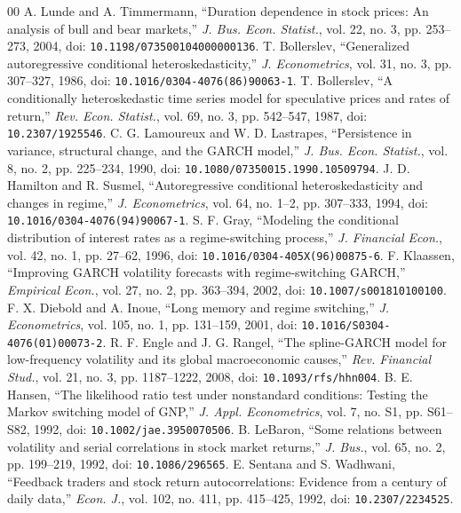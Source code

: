 \documentclass[conference]{IEEEtran}
\begin{document}
\begin{thebibliography}{00}
 A. Lunde and A. Timmermann, ``Duration dependence in stock prices: An analysis of bull and bear markets,'' \textit{J. Bus. Econ. Statist.}, vol. 22, no. 3, pp. 253--273, 2004, doi: \nolinkurl{10.1198/073500104000000136}.
 T. Bollerslev, ``Generalized autoregressive conditional heteroskedasticity,'' \textit{J. Econometrics}, vol. 31, no. 3, pp. 307--327, 1986, doi: \nolinkurl{10.1016/0304-4076(86)90063-1}.
 T. Bollerslev, ``A conditionally heteroskedastic time series model for speculative prices and rates of return,'' \textit{Rev. Econ. Statist.}, vol. 69, no. 3, pp. 542--547, 1987, doi: \nolinkurl{10.2307/1925546}.
 C. G. Lamoureux and W. D. Lastrapes, ``Persistence in variance, structural change, and the GARCH model,'' \textit{J. Bus. Econ. Statist.}, vol. 8, no. 2, pp. 225--234, 1990, doi: \nolinkurl{10.1080/07350015.1990.10509794}.
 J. D. Hamilton and R. Susmel, ``Autoregressive conditional heteroskedasticity and changes in regime,'' \textit{J. Econometrics}, vol. 64, no. 1--2, pp. 307--333, 1994, doi: \nolinkurl{10.1016/0304-4076(94)90067-1}.
 S. F. Gray, ``Modeling the conditional distribution of interest rates as a regime-switching process,'' \textit{J. Financial Econ.}, vol. 42, no. 1, pp. 27--62, 1996, doi: \nolinkurl{10.1016/0304-405X(96)00875-6}.
 F. Klaassen, ``Improving GARCH volatility forecasts with regime-switching GARCH,'' \textit{Empirical Econ.}, vol. 27, no. 2, pp. 363--394, 2002, doi: \nolinkurl{10.1007/s001810100100}.
 F. X. Diebold and A. Inoue, ``Long memory and regime switching,'' \textit{J. Econometrics}, vol. 105, no. 1, pp. 131--159, 2001, doi: \nolinkurl{10.1016/S0304-4076(01)00073-2}.
 R. F. Engle and J. G. Rangel, ``The spline-GARCH model for low-frequency volatility and its global macroeconomic causes,'' \textit{Rev. Financial Stud.}, vol. 21, no. 3, pp. 1187--1222, 2008, doi: \nolinkurl{10.1093/rfs/hhn004}.
 B. E. Hansen, ``The likelihood ratio test under nonstandard conditions: Testing the Markov switching model of GNP,'' \textit{J. Appl. Econometrics}, vol. 7, no. S1, pp. S61--S82, 1992, doi: \nolinkurl{10.1002/jae.3950070506}.
 B. LeBaron, ``Some relations between volatility and serial correlations in stock market returns,'' \textit{J. Bus.}, vol. 65, no. 2, pp. 199--219, 1992, doi: \nolinkurl{10.1086/296565}.
 E. Sentana and S. Wadhwani, ``Feedback traders and stock return autocorrelations: Evidence from a century of daily data,'' \textit{Econ. J.}, vol. 102, no. 411, pp. 415--425, 1992, doi: \nolinkurl{10.2307/2234525}.

\end{thebibliography}
\end{document}
